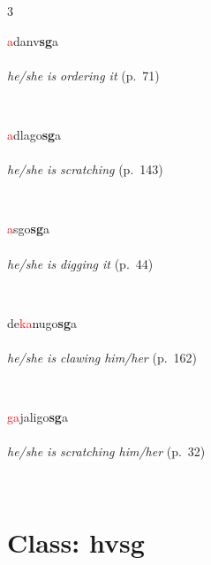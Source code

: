 \documentclass[oneside,openany]{book}%
\begin{document}
\noindent\begin{multicols}{3}%
\begin{minipage}[t]{\linewidth}
\raggedright\noindent \textcolor{Red}{a}danv\textbf{sg}a\\
\\
\noindent \textit{he/she is ordering it} (p.~71)
\end{minipage}\\[1em]%
\begin{minipage}[t]{\linewidth}
\raggedright\noindent \textcolor{Red}{a}dlago\textbf{sg}a\\
\\
\noindent \textit{he/she is scratching} (p.~143)
\end{minipage}\\[1em]%
\begin{minipage}[t]{\linewidth}
\raggedright\noindent \textcolor{Red}{a}sgo\textbf{sg}a\\
\\
\noindent \textit{he/she is digging it} (p.~44)
\end{minipage}\\[1em]%
\begin{minipage}[t]{\linewidth}
\raggedright\noindent de\textcolor{Red}{ka}nugo\textbf{sg}a\\
\\
\noindent \textit{he/she is clawing him/her} (p.~162)
\end{minipage}\\[1em]%
\begin{minipage}[t]{\linewidth}
\raggedright\noindent \textcolor{Red}{ga}jaligo\textbf{sg}a\\
\\
\noindent \textit{he/she is scratching him/her} (p.~32)
\end{minipage}\\[1em]%
\end{multicols}%
\vspace{1em}%
\needspace{3in}%
\section*{Class: hvsg}%
%
\needspace{1.5in}%
\end{document}
